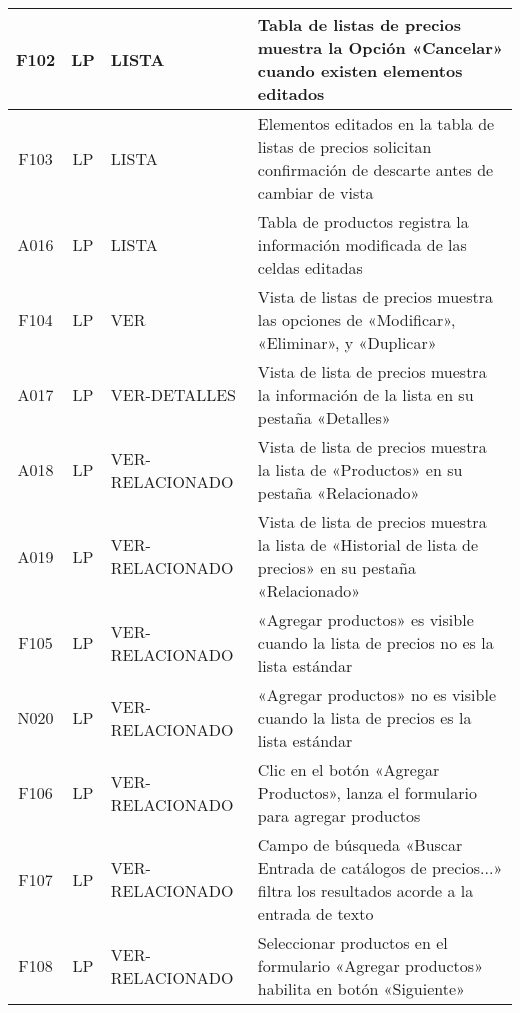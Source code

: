 \begin{landscape}
{\begin{longtable}[htb]{|c|c|p{3.8cm}|p{15.2cm}|}
\scriptsize{F102} & \scriptsize{LP} & \scriptsize{LISTA} & \scriptsize{Tabla de listas de precios muestra la Opción «Cancelar» cuando existen elementos editados} \\ \hline
\scriptsize{F103} & \scriptsize{LP} & \scriptsize{LISTA} & \scriptsize{Elementos editados en la tabla de listas de precios solicitan confirmación de descarte antes de cambiar de vista} \\ \hline
\scriptsize{A016} & \scriptsize{LP} & \scriptsize{LISTA} & \scriptsize{Tabla de productos registra la información modificada de las celdas editadas} \\ \hline
\scriptsize{F104} & \scriptsize{LP} & \scriptsize{VER} & \scriptsize{Vista de listas de precios muestra las opciones de «Modificar», «Eliminar», y «Duplicar»} \\ \hline
\scriptsize{A017} & \scriptsize{LP} & \scriptsize{VER-DETALLES} & \scriptsize{Vista de lista de precios muestra la información de la lista en su pestaña «Detalles»} \\ \hline
\scriptsize{A018} & \scriptsize{LP} & \scriptsize{VER-RELACIONADO} & \scriptsize{Vista de lista de precios muestra la lista de «Productos» en su pestaña «Relacionado»} \\ \hline
\scriptsize{A019} & \scriptsize{LP} & \scriptsize{VER-RELACIONADO} & \scriptsize{Vista de lista de precios muestra la lista de «Historial de lista de precios» en su pestaña «Relacionado»} \\ \hline
\scriptsize{F105} & \scriptsize{LP} & \scriptsize{VER-RELACIONADO} & \scriptsize{«Agregar productos» es visible cuando la lista de precios no es la lista estándar} \\ \hline
\scriptsize{N020} & \scriptsize{LP} & \scriptsize{VER-RELACIONADO} & \scriptsize{«Agregar productos» no es visible cuando la lista de precios es la lista estándar} \\ \hline
\scriptsize{F106} & \scriptsize{LP} & \scriptsize{VER-RELACIONADO} & \scriptsize{Clic en el botón «Agregar Productos», lanza el formulario para agregar productos} \\ \hline
\scriptsize{F107} & \scriptsize{LP} & \scriptsize{VER-RELACIONADO} & \scriptsize{Campo de búsqueda «Buscar Entrada de catálogos de precios...» filtra los resultados acorde a la entrada de texto} \\ \hline
\scriptsize{F108} & \scriptsize{LP} & \scriptsize{VER-RELACIONADO} & \scriptsize{Seleccionar productos en el formulario «Agregar productos» habilita en botón «Siguiente»} \\ \hline

\end{longtable}}
\end{landscape}
